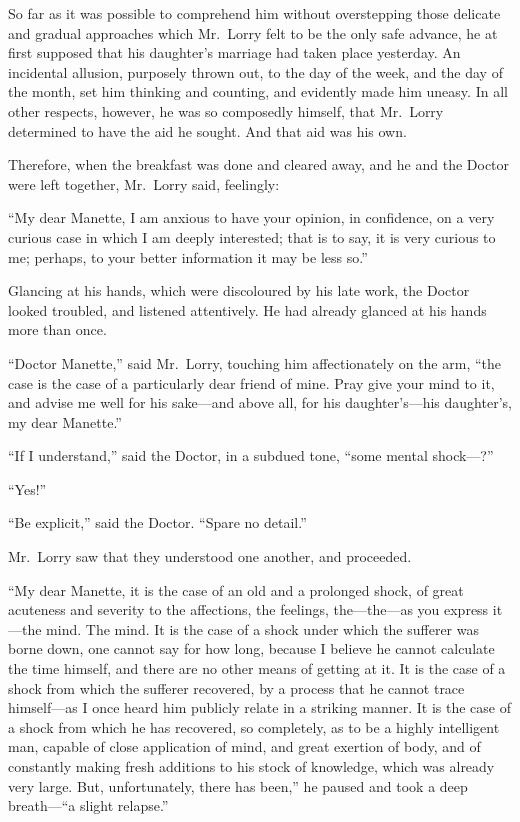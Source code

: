 So far as it was possible to comprehend him without overstepping
those delicate and gradual approaches which Mr.\ Lorry felt to be the
only safe advance, he at first supposed that his daughter's marriage
had taken place yesterday.  An incidental allusion, purposely thrown
out, to the day of the week, and the day of the month, set him thinking
and counting, and evidently made him uneasy.  In all other respects,
however, he was so composedly himself, that Mr.\ Lorry determined to
have the aid he sought.  And that aid was his own.

Therefore, when the breakfast was done and cleared away, and he and
the Doctor were left together, Mr.\ Lorry said, feelingly:

``My dear Manette, I am anxious to have your opinion, in confidence,
on a very curious case in which I am deeply interested; that is to say,
it is very curious to me; perhaps, to your better information it may
be less so.''

Glancing at his hands, which were discoloured by his late work, the
Doctor looked troubled, and listened attentively.  He had already
glanced at his hands more than once.

``Doctor Manette,'' said Mr.\ Lorry, touching him affectionately on the
arm, ``the case is the case of a particularly dear friend of mine.
Pray give your mind to it, and advise me well for his sake---and
above all, for his daughter's---his daughter's, my dear Manette.''

``If I understand,'' said the Doctor, in a subdued tone, ``some mental
shock---?''

``Yes!''

``Be explicit,'' said the Doctor.  ``Spare no detail.''

Mr.\ Lorry saw that they understood one another, and proceeded.

``My dear Manette, it is the case of an old and a prolonged shock, of
great acuteness and severity to the affections, the feelings,
the---the---as you express it---the mind.  The mind.  It is the case of
a shock under which the sufferer was borne down, one cannot say for
how long, because I believe he cannot calculate the time himself, and
there are no other means of getting at it.  It is the case of a shock
from which the sufferer recovered, by a process that he cannot trace
himself---as I once heard him publicly relate in a striking manner.
It is the case of a shock from which he has recovered, so completely,
as to be a highly intelligent man, capable of close application of mind,
and great exertion of body, and of constantly making fresh additions to
his stock of knowledge, which was already very large.  But, unfortunately,
there has been,'' he paused and took a deep breath---``a slight relapse.''

